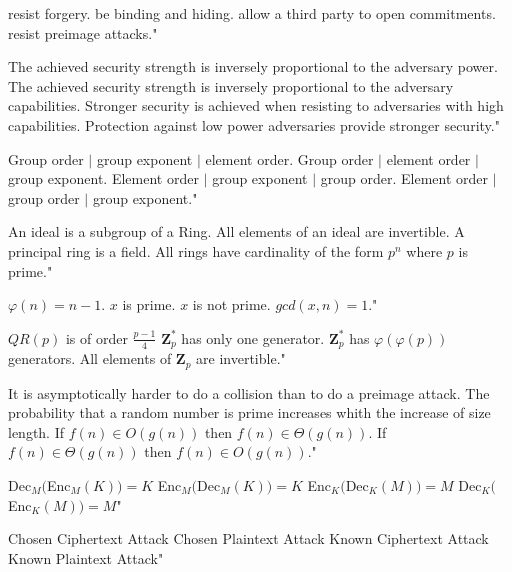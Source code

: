 {resist forgery.}
{be binding and hiding.}
{allow a third party to open commitments.}
{resist preimage attacks."}

{The achieved security strength is inversely proportional to the adversary power.}
{The achieved security strength is inversely proportional to the adversary capabilities.}
{Stronger security is achieved when resisting to adversaries with high capabilities.}
{Protection against low power adversaries provide stronger security."}

{Group order $\mid$ group exponent $\mid$ element order.}
{Group order $\mid$ element order $\mid$ group exponent.}
{Element order $\mid$ group exponent $\mid$ group order.}
{Element order $\mid$ group order $\mid$ group exponent."}

{An ideal is a subgroup of a Ring.}
{All elements of an ideal are invertible.}
{A principal ring is a field.}
{All rings have cardinality of the form $p^n$ where $p$ is prime."}

{$\varphi(n)= n-1$.}
{$x$ is prime.}
{$x$ is not prime.}
{$gcd(x,n) = 1$."}

{$QR(p)$ is of order $\frac{p-1}{4}$}
{$\mathbf{Z}_{p}^*$ has only one generator.}
{$\mathbf{Z}_{p}^*$ has $\varphi(\varphi(p))$ generators.}
{All elements of $\mathbf{Z}_{p}$ are invertible."}

{It is asymptotically harder to do a collision than to do a preimage attack.}
{The probability that a random number is prime increases whith the increase of size length.}
{If $f(n)\in O(g(n))$ then $f(n)\in \Theta(g(n))$.}
{If $f(n)\in \Theta(g(n))$ then $f(n)\in O(g(n))$."}

{Dec$_{M}($Enc$_{M}(K))=K$}
{Enc$_{M}($Dec$_{M}(K))=K$}
{Enc$_{K}($Dec$_{K}(M))=M$}
{Dec$_{K}($Enc$_{K}(M))=M$"}

{Chosen Ciphertext Attack}
{Chosen Plaintext Attack}
{Known Ciphertext Attack}
{Known Plaintext Attack"}

